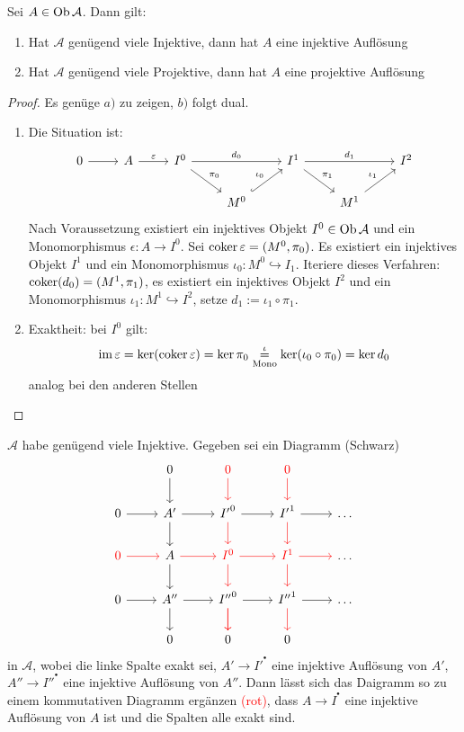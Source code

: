 \begin{bem}\label{7.8}
	Sei $A\in \text{Ob}\,\mathcal{A}$. Dann gilt:
	\begin{enumerate}[label = \alph*)]
		\item Hat $\mathcal{A}$ genügend viele Injektive, dann hat $A$ eine injektive Auflösung
		\item Hat $\mathcal{A}$ genügend viele Projektive, dann hat $A$ eine projektive Auflösung
	\end{enumerate}
\end{bem}
\begin{proof}
	Es genüge $a)$ zu zeigen, $b)$ folgt dual.
	\begin{enumerate}
		\item Die Situation ist:
		$$\begin{tikzcd}
		0 \arrow{r} & A \arrow{r}{\epsilon}& I^0 \arrow{dr}{\pi_0} \arrow{rr}{d_0} & & I^1\arrow{dr}{\pi_1} \arrow{rr}{d_1} & & I^2 \\
		& & & M^0 \arrow[hook]{ur}{\iota_0} & & M^1 \arrow{ur}{\iota_1}  &		
		\end{tikzcd}$$
		Nach Voraussetzung existiert ein injektives Objekt $I^0 \in \text{Ob}\,\mathcal{A}$ und ein Monomorphismus $\epsilon:A \to I^0$. Sei $\operatorname{coker} \varepsilon= (M^0, \pi_0)$. Es existiert ein injektives Objekt $I^1$ und ein Monomorphismus $\iota_0:M^0 \hookrightarrow I_1$. Iteriere dieses Verfahren: $\operatorname{coker}(d_0) = (M^1, \pi_1)$, es existiert ein injektives Objekt $I^2$ und ein Monomorphismus $\iota_1:M^1\hookrightarrow I^2$, setze $d_1:= \iota_1 \circ \pi_1$.
		\item Exaktheit: bei $I^0$ gilt:
		$$\operatorname{im} \varepsilon = \ker (\operatorname{coker} \varepsilon) = \ker \pi_0 \underset{\text{Mono}}{\overset{\iota}{=}} \ker (\iota_0 \circ \pi_0) = \ker d_0$$
		analog bei den anderen Stellen
	\end{enumerate}
\end{proof}
\begin{sa}[Hufeisenlemma]\label{7.9}
	$\mathcal{A}$ habe genügend viele Injektive. Gegeben sei ein Diagramm (Schwarz)
	$$\begin{tikzcd}
	& 0\arrow{d} &\textcolor{red}{0} \arrow[red]{d} & \textcolor{red}{0} \arrow[red]{d} & \\
	0 \arrow{r}& A'\arrow{d} \arrow{r} & {I'}^0\arrow[red]{d} \arrow{r} & {I'}^1 \arrow[red]{d} \arrow{r} & \ldots\\
	\textcolor{red}{0} \arrow[red]{r}& A\arrow{d} \arrow[red]{r}& \textcolor{red}{I^0} \arrow[red]{d}\arrow[red]{r} &\arrow[red]{d} \textcolor{red}{I^1} \arrow[red]{r} & \ldots\\
	0 \arrow{r} & A''\arrow{d} \arrow{r} & {I''}^0\arrow[red]{d} \arrow[red]{d} \arrow{r} & {I''}^1 \arrow[red]{d} \arrow{r} & \ldots\\
	& 0 & 0 & 0
	\end{tikzcd}$$
	in $\mathcal{A}$, wobei die linke Spalte exakt sei, $A'\to I'^{^\bullet}$ eine injektive Auflösung von $A'$, $A''\to {I''}^{^\bullet}$ eine injektive Auflösung von $A''$. Dann lässt sich das Daigramm so zu einem kommutativen Diagramm ergänzen \textcolor{red}{(rot)}, dass $A\to I^{^\bullet}$ eine injektive Auflösung von $A$ ist und die Spalten alle exakt sind.
\end{sa}

